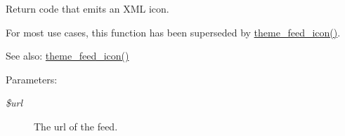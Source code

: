 Return code that emits an XML icon.

For most use cases, this function has been superseded by \hyperlink{group__themeable_ge5d10f67376dfa4cd18256bf1d496169}{theme\_\-feed\_\-icon()}.

\begin{Desc}
\item[See also:]\hyperlink{group__themeable_ge5d10f67376dfa4cd18256bf1d496169}{theme\_\-feed\_\-icon()} \end{Desc}
\begin{Desc}
\item[Parameters:]
\begin{description}
\item[{\em \$url}]The url of the feed. \end{description}
\end{Desc}
